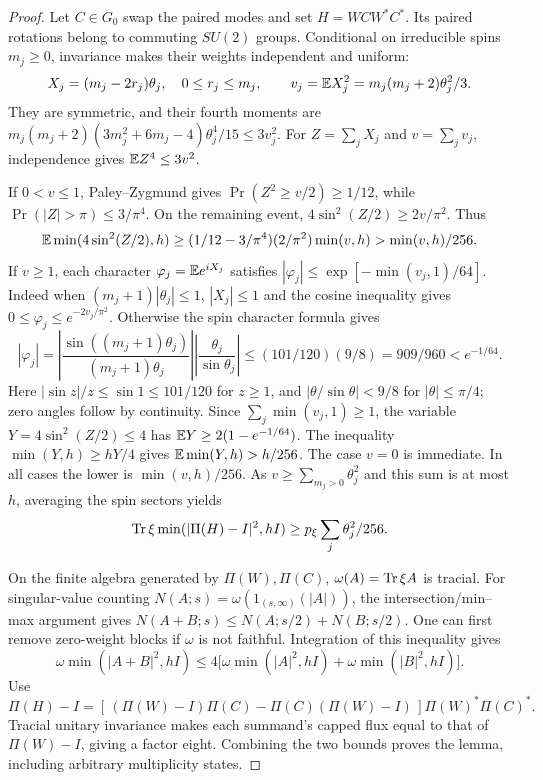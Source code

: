 \begin{proof}
Let $C\in G_0$ swap the paired modes and set $H=WCW^*C^*$.
Its paired rotations belong to commuting $SU(2)$ groups. Conditional
on irreducible spins $m_j\geq0$, invariance makes their weights
independent and uniform:
\[
 X_j=(m_j-2r_j)\theta_j,\quad 0\leq r_j\leq m_j,
 \qquad v_j=\mathbb E X_j^2=m_j(m_j+2)\theta_j^2/3.
\]
They are symmetric, and their fourth moments are
$m_j(m_j+2)(3m_j^2+6m_j-4)\theta_j^4/15\leq3v_j^2$.
For $Z=\sum_jX_j$ and $v=\sum_jv_j$, independence gives
$\mathbb E Z^4\leq3v^2$.

If $0<v\leq1$, Paley--Zygmund gives
$\Pr(Z^2\geq v/2)\geq1/12$, while
$\Pr(|Z|>\pi)\leq3/\pi^4$. On the remaining event,
$4\sin^2(Z/2)\geq2v/\pi^2$. Thus
\[
 \mathbb E\min(4\sin^2(Z/2),h)
 \geq(1/12-3/\pi^4)(2/\pi^2)\min(v,h)
 >\min(v,h)/256.
\]
If $v\geq1$, each character $\varphi_j=\mathbb E e^{iX_j}$ satisfies
$|\varphi_j|\leq\exp[-\min(v_j,1)/64]$.
Indeed when $(m_j+1)|\theta_j|\leq1$, $|X_j|\leq1$ and the cosine
inequality gives $0\leq\varphi_j\leq e^{-2v_j/\pi^2}$.
Otherwise the spin character formula gives
\[
 |\varphi_j|=
 \left|\frac{\sin((m_j+1)\theta_j)}{(m_j+1)\theta_j}\right|
 \left|\frac{\theta_j}{\sin\theta_j}\right|
 \leq(101/120)(9/8)=909/960<e^{-1/64}.
\]
Here $|\sin z|/z\leq\sin1\leq101/120$ for $z\geq1$,
and $|\theta/\sin\theta|<9/8$ for $|\theta|\leq\pi/4$;
zero angles follow by continuity. Since
$\sum_j\min(v_j,1)\geq1$, the variable
$Y=4\sin^2(Z/2)\leq4$ has
$\mathbb E Y\geq2(1-e^{-1/64})$. The inequality
$\min(Y,h)\geq hY/4$ gives $\mathbb E\min(Y,h)>h/256$.
The case $v=0$ is immediate. In all cases the lower is
$\min(v,h)/256$. As
$v\geq\sum_{m_j>0}\theta_j^2$ and this sum is at most $h$,
averaging the spin sectors yields
\[
 \operatorname{Tr}\xi\min(|\Pi(H)-I|^2,hI)
                  \geq p_\xi\sum_j\theta_j^2/256.
\]

On the finite algebra generated by $\Pi(W),\Pi(C)$,
$\omega(A)=\operatorname{Tr}\xi A$ is tracial. For singular-value counting
$N(A;s)=\omega(1_{(s,\infty)}(|A|))$, the intersection/min--max
argument gives $N(A+B;s)\leq N(A;s/2)+N(B;s/2)$.
One can first remove zero-weight blocks if $\omega$ is not faithful.
Integration of this inequality gives
\[
 \omega\min(|A+B|^2,hI)
 \leq4\bigl[\omega\min(|A|^2,hI)+
             \omega\min(|B|^2,hI)\bigr].
\]
Use
\[
 \Pi(H)-I=
 [\, (\Pi(W)-I)\Pi(C)-\Pi(C)(\Pi(W)-I)\,]
                  \Pi(W)^*\Pi(C)^*.
\]
Tracial unitary invariance makes each summand's capped flux equal
to that of $\Pi(W)-I$, giving a factor eight. Combining the two
bounds proves the lemma, including arbitrary multiplicity states.
\end{proof}

